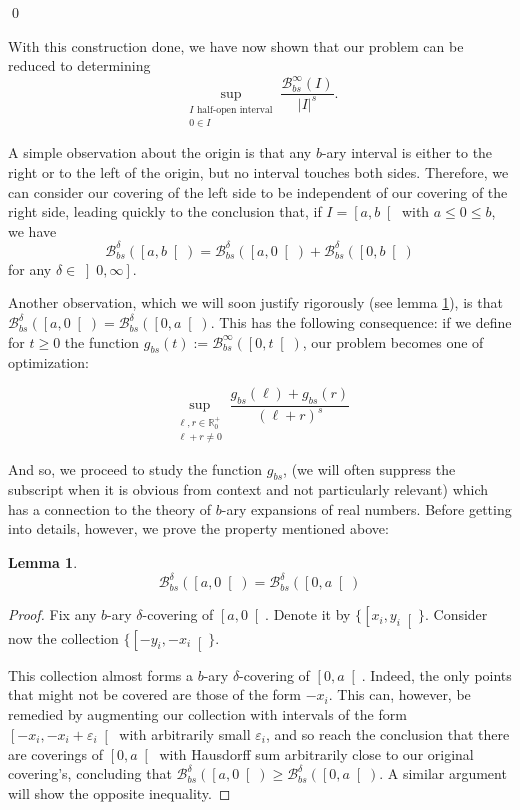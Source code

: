 \documentclass[11pt, reqno]{amsart}
\newcommand{\R}{\mathbb{R}}
\newcommand{\BB}{\mathcal{B}}
\newtheorem{lemma}{Lemma}
\begin{document}
\qed

With this construction done, we have now shown that our problem can be reduced to determining
\[\sup_{\substack{\text{$I$ half-open interval}\\ 0 \in I}} \frac{\BB_{bs}^\infty(I)}{\lvert I \rvert^s}.\]

A simple observation about the origin is that any $b$-ary interval is either to the right or to the left of the origin, but no interval touches both sides. Therefore, we can consider our covering of the left side to be independent of our covering of the right side, leading quickly to the conclusion that, if $I = \left[ a, b \right[$ with $a \leq 0 \leq b$, we have
\[\BB_{bs}^\delta(\left[a, b\right[) = \BB_{bs}^\delta(\left[a, 0\right[) + \BB_{bs}^\delta(\left[0, b\right[)\]
for any $\delta \in \left]0, \infty \right]$.

Another observation, which we will soon justify rigorously (see lemma \ref{sidedoesntmatter}), is that $\BB_{bs}^\delta(\left[a, 0\right[) = \BB_{bs}^\delta(\left[0, a\right[)$. This has the following consequence: if we define for $t \geq 0$ the function $g_{bs}(t) := \BB_{bs}^\infty(\left[0, t \right[)$, our problem becomes one of optimization:

\[ \sup_{\substack{\ell,r \in \R^+_0\\\ell+r \neq 0}} \frac{g_{bs}(\ell) + g_{bs}(r)}{(\ell + r)^s} \]

And so, we proceed to study the function $g_{bs}$, (we will often suppress the subscript when it is obvious from context and not particularly relevant) which has a connection to the theory of $b$-ary expansions of real numbers. Before getting into details, however, we prove the property mentioned above:

\begin{lemma} \label{sidedoesntmatter}
\[\BB_{bs}^\delta(\left[a, 0\right[) = \BB_{bs}^\delta(\left[0, a\right[)\]
\end{lemma}

\begin{proof}
Fix any $b$-ary $\delta$-covering of $\left[a, 0\right[$. Denote it by $\{\left[x_i, y_i\right[\}$. Consider now the collection $\{\left[-y_i, -x_i\right[\}$. 

This collection almost forms a $b$-ary $\delta$-covering of $\left[0, a\right[$. Indeed, the only points that might not be covered are those of the form $-x_i$. This can, however, be remedied by augmenting our collection with intervals of the form $\left[ -x_i, -x_i + \varepsilon_i \right[$ with arbitrarily small $\varepsilon_i$, and so reach the conclusion that there are coverings of $\left[0, a\right[$ with Hausdorff sum arbitrarily close to our original covering's, concluding that $\BB_{bs}^\delta(\left[a, 0\right[) \geq \BB_{bs}^\delta(\left[0, a\right[)$. A similar argument will show the opposite inequality.
\end{proof}
\end{document}
